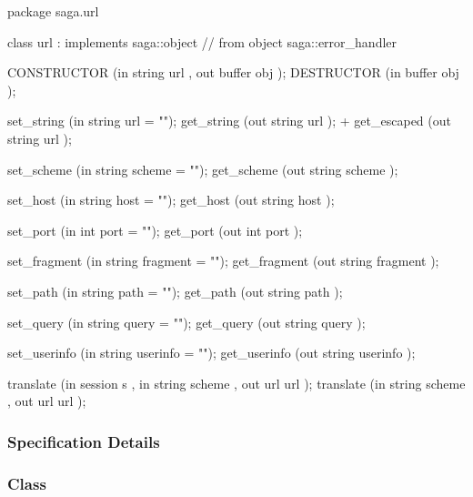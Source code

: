  \begin{myspec}
  package saga.url
  {
    class url : implements   saga::object
             // from object  saga::error_handler
    {
      CONSTRUCTOR   (in  string     url       ,
                     out buffer     obj       );
      DESTRUCTOR    (in  buffer     obj       );
 
      set_string    (in  string     url       = "");
      get_string    (out string     url       );
+     get_escaped   (out string     url       );
 
      set_scheme    (in  string     scheme    = "");
      get_scheme    (out string     scheme    );
 
      set_host      (in  string     host      = "");
      get_host      (out string     host      );
 
      set_port      (in  int        port      = "");
      get_port      (out int        port      );
 
      set_fragment  (in  string     fragment  = "");
      get_fragment  (out string     fragment  );
 
      set_path      (in  string     path      = "");
      get_path      (out string     path      );
 
      set_query     (in  string     query     = "");
      get_query     (out string     query     );
 
      set_userinfo  (in  string     userinfo  = "");
      get_userinfo  (out string     userinfo  );
 
      translate     (in  session    s         ,
                     in  string     scheme    ,
                     out url        url       );
      translate     (in  string     scheme    ,
                     out url        url       );
    }
  }
 \end{myspec}
 
 
 \subsubsection{Specification Details}
 
 \subsubsection*{Class }
 
